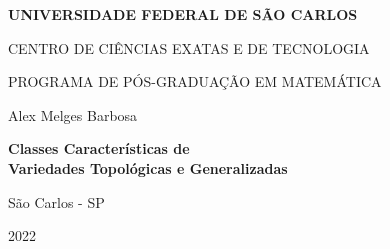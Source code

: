 \documentclass[12pt,oneside]{book} %
\begin{document}
\selectfont %






\begin{titlepage}
 \begin{center}
  \textbf{UNIVERSIDADE FEDERAL DE SÃO CARLOS}
 \end{center}
 \vspace{-0.8cm}
 \begin{center}  
  \scriptsize{CENTRO DE CIÊNCIAS EXATAS E DE TECNOLOGIA}
 \end{center}
 \vspace{-0.8cm}
 \begin{center}
  \scriptsize{PROGRAMA DE PÓS-GRADUAÇÃO EM MATEMÁTICA}
 \end{center}
 \vspace{3cm}
 \begin{center}
  \small{Alex Melges Barbosa}
 \end{center}
 \vspace{3cm}
 \begin{center}
  \Large{\textbf{Classes Características de \\ Variedades Topológicas e Generalizadas}} %
 \end{center}
 \vspace{12cm}
 \begin{center}
  São Carlos - SP
 \end{center}
 \vspace{-0.8cm}
 \begin{center}
  2022
 \end{center}
\end{titlepage}
\end{document}
